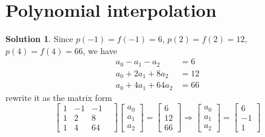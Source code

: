 \documentclass{article}
\theoremstyle{definition}
\newtheorem{solution}{Solution}
\begin{document}
\section{Polynomial interpolation}
\begin{solution}
  Since $p(-1)=f(-1)=6$, $p(2)=f(2)=12$, $p(4)=f(4)=66$, we have
  \begin{align}
    a_0-a_1-a_2&=6\\
    a_0+2a_1+8a_2&=12\\
    a_0+4a_1+64a_2&=66
  \end{align}
  rewrite it as the matrix form
  \begin{equation}
    \begin{bmatrix}
      1& -1& -1\\
      1&  2& 8\\
      1& 4& 64&
    \end{bmatrix}\begin{bmatrix}
      a_0\\
      a_1\\
      a_2
    \end{bmatrix}=\begin{bmatrix}
      6\\
      12\\
      66
    \end{bmatrix}\Rightarrow\begin{bmatrix}
      a_0\\
      a_1\\
      a_2
    \end{bmatrix}=\begin{bmatrix}
      6\\
      -1\\
      1
    \end{bmatrix}
  \end{equation}
\end{solution}
\end{document}
